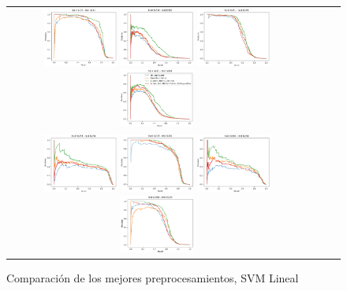 \begin{figure}[h!]
\begin{tabular}{cccc}
  \includegraphics[width=0.25\textwidth]{Kap4/Figure_13.png}  \includegraphics[width=0.25\textwidth]{Kap4/Figure_14.png}
  \includegraphics[width=0.25\textwidth]{Kap4/Figure_15.png}  \includegraphics[width=0.25\textwidth]{Kap4/Figure_16.png} \\

\includegraphics[width=0.25\textwidth]{Kap4/Figure_17.png}  \includegraphics[width=0.25\textwidth]{Kap4/Figure_18.png} 
 \includegraphics[width=0.25\textwidth]{Kap4/Figure_19.png}  \includegraphics[width=0.25\textwidth]{Kap4/Figure_20.png} 
\end{tabular}
\caption{Comparación de los mejores preprocesamientos, SVM Lineal}
\label{fig:svml_final_comparison}
\end{figure}
